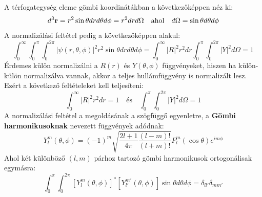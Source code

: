 \documentclass[../main.tex]{subfiles}
\begin{document}
A térfogategység eleme gömbi koordinátákban a következőképpen néz ki:
\begin{equation}
    d^3 \bold{r} = r^2 \sin \theta dr d\theta d\phi = r^2 dr d\Omega \quad \text{ahol} \quad d\Omega = \sin \theta d\theta d\phi
\end{equation}
A normalizálási feltétel pedig a következőképpen alakul:
\begin{equation}
    \int_0^{\infty} \int_0^{\pi} \int_0^{2 \pi} |\psi(r,\theta,\phi)|^2 r^2 \sin \theta dr d\theta d\phi = \int_0^{\infty} |R|^2 r^2 dr \int_0^{\pi} \int_0^{2 \pi} |Y|^2 d\Omega = 1
\end{equation}
Érdemes külön normalizálni a $R(r)$ és $Y(\theta,\phi)$ függvényeket, hiszen ha külön-külön normalizálva vannak, akkor a teljes hullámfüggvény is normalizált lesz. Ezért a következő feltételeket kell teljesíteni:
\begin{equation}
    \int_0^{\infty} |R|^2 r^2 dr = 1 \quad \text{és} \quad \int_0^{\pi} \int_0^{2 \pi} |Y|^2 d\Omega = 1
\end{equation}
A normalizálási feltétel a megoldásának a szögfüggő egyenletre, a \textbf{Gömbi harmonikusoknak} nevezett függvények adódnak:
\begin{equation}
    \boxed{Y_l^m (\theta, \phi) = (-1)^m \sqrt{\frac{2l + 1}{4 \pi} \frac{(l - m)!}{(l + m)!}} P_l^m (\cos \theta) e^{i m \phi}}
\end{equation}
Ahol két különböző $(l,m)$ párhoz tartozó gömbi harmonikusok ortogonálisak egymásra:
\begin{equation}
    \int_0^{\pi} \int_0^{2 \pi} \left[Y_{l}^{m} (\theta, \phi)\right]^* \left[Y_{l'}^{m'} (\theta, \phi)\right] \sin \theta d\theta d\phi = \delta_{l l'} \delta_{m m'}
\end{equation}
\end{document}
